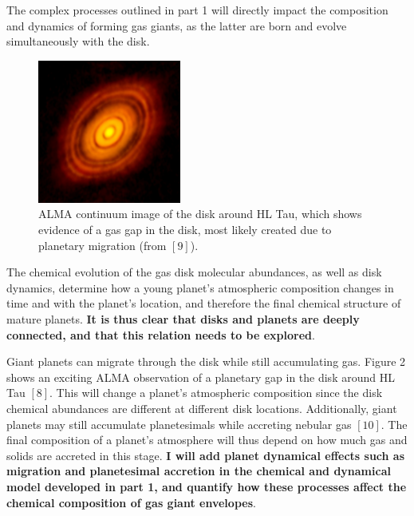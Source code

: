 \documentclass[12pt, letterpaper]{article}
\begin{document}
The complex processes outlined in part 1 will directly impact the composition and dynamics of forming gas giants, as the latter are born and evolve simultaneously with the disk. 
\begin{figure}
\vspace{-0.4in}
\begin{center}
\includegraphics[width=0.42\textwidth]{HLTau_nrao}
\end{center}
\caption{ALMA continuum image of the disk around HL Tau, which shows evidence of a gas gap in the disk, most likely created due to planetary migration (from $[9]$).}
\vspace{-0.25in}
\end{figure}
The chemical evolution of the gas disk molecular abundances, as well as disk dynamics, determine how a young planet's atmospheric composition changes in time and with the planet's location, and therefore the final chemical structure of mature planets. \textbf{It is thus clear that disks and planets are deeply connected, and that this relation needs to be explored}. %

Giant planets can migrate through the disk while still accumulating gas. Figure 2 shows an exciting ALMA observation of a planetary gap in the disk around HL Tau $[8]$. This will change a planet's atmospheric composition since the disk chemical abundances are different at different disk locations. Additionally, giant planets may still accumulate planetesimals while accreting nebular gas $[10]$. The final composition of a planet's atmosphere will thus depend on how much gas and solids are accreted in this stage. \textbf{I will add planet dynamical effects such as migration and planetesimal accretion in the chemical and dynamical model developed in part 1, and quantify how these processes affect the chemical composition of gas giant envelopes}.
\end{document}

